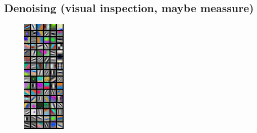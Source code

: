 \documentclass{article}
\begin{document}
\subsection{ Denoising (visual inspection, maybe meassure)}
\begin{figure}[h]
  \begin{minipage}[b]{0.48\linewidth}
  	\includegraphics[width=\textwidth]{img/first.png}

\end{minipage}
\end{figure}
\end{document}
